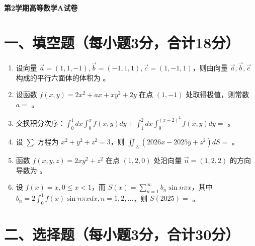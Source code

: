\documentclass[12pt,a4paper]{article}
\begin{document}
\begin{center}
    {\Large \textbf{第2学期\quad 高等数学A\quad 试卷}}
\end{center}

\section*{一、填空题（每小题3分，合计18分）}

\begin{enumerate}[label=\arabic*、, itemsep=1.5em]
    \item 设向量 \(\vec{a} = (1,1,-1), \vec{b} = (-1,1,1), \vec{c} = (1,-1,1)\)，则由向量 \(\vec{a},\vec{b},\vec{c}\) 构成的平行六面体的体积为 \underline{\hspace{3cm}}。

    \item 设函数 \(f(x,y) = 2x^{2} + ax + xy^{2} + 2y\) 在点 \((1,-1)\) 处取得极值，则常数 \(a =\) \underline{\hspace{3cm}}。

    \item 交换积分次序：\(\displaystyle \int_{0}^{1}dx\int_{0}^{x}f(x,y)dy + \int_{1}^{2}dx\int_{0}^{(x-2)^{2}}f(x,y)dy =\) \underline{\hspace{3cm}}。

    \item 设 \(\sum\) 方程为 \(x^{2} + y^{2} + z^{2} = 3\)，则 \(\displaystyle \iint_{\Sigma}(2026x - 2025y + z^{2})dS =\) \underline{\hspace{3cm}}。

    \item 函数 \(f(x,y,z) = 2xy^{2} + z^{2}\) 在点 \((1,2,0)\) 处沿向量 \(\vec{n} = (1,2,2)\) 的方向导数为 \underline{\hspace{3cm}}。

    \item 设 \(f(x) = x, 0 \leq x < 1\)，而 \(S(x) = \displaystyle \sum_{n=1}^{\infty}b_{n}\sin n\pi x\)，其中 \(b_{n} = 2\int_{0}^{1}f(x)\sin n\pi xdx, n=1,2,\dots\)，则 \(S(2025) =\) \underline{\hspace{3cm}}。
\end{enumerate}

\section*{二、选择题（每小题3分，合计30分）}
\end{document}

